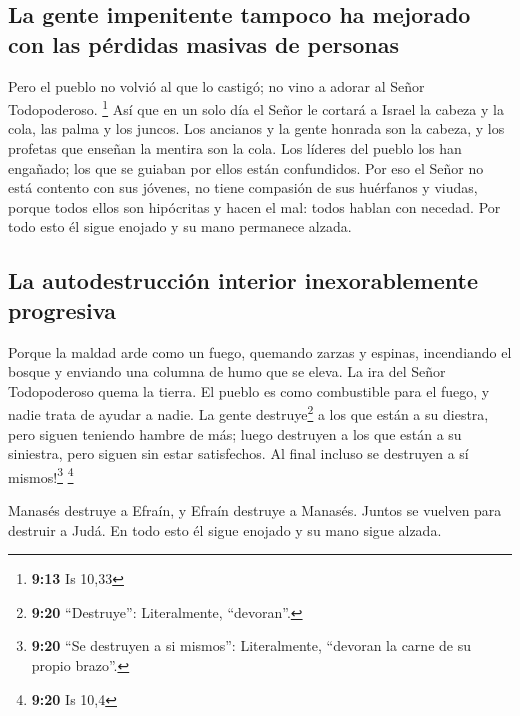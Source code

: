 \hypertarget{la-gente-impenitente-tampoco-ha-mejorado-con-las-puxe9rdidas-masivas-de-personas}{%
\subsection{La gente impenitente tampoco ha mejorado con las pérdidas
masivas de
personas}\label{la-gente-impenitente-tampoco-ha-mejorado-con-las-puxe9rdidas-masivas-de-personas}}

 Pero el pueblo no volvió al que lo castigó; no vino a
adorar al Señor Todopoderoso. \footnote{\textbf{9:13} Is 10,33}
 Así que en un solo día el Señor le cortará a Israel la
cabeza y la cola, las palma y los juncos.  Los ancianos y
la gente honrada son la cabeza, y los profetas que enseñan la mentira
son la cola.  Los líderes del pueblo los han engañado;
los que se guiaban por ellos están confundidos.  Por eso
el Señor no está contento con sus jóvenes, no tiene compasión de sus
huérfanos y viudas, porque todos ellos son hipócritas y hacen el mal:
todos hablan con necedad. Por todo esto él sigue enojado y su mano
permanece alzada.

\hypertarget{la-autodestrucciuxf3n-interior-inexorablemente-progresiva}{%
\subsection{La autodestrucción interior inexorablemente
progresiva}\label{la-autodestrucciuxf3n-interior-inexorablemente-progresiva}}

 Porque la maldad arde como un fuego, quemando zarzas y
espinas, incendiando el bosque y enviando una columna de humo que se
eleva.  La ira del Señor Todopoderoso quema la tierra. El
pueblo es como combustible para el fuego, y nadie trata de ayudar a
nadie.  La gente destruye\footnote{\textbf{9:20}
  ``Destruye'': Literalmente, ``devoran''.} a los que están a su
diestra, pero siguen teniendo hambre de más; luego destruyen a los que
están a su siniestra, pero siguen sin estar satisfechos. Al final
incluso se destruyen a sí mismos!\footnote{\textbf{9:20} ``Se destruyen
  a si mismos'': Literalmente, ``devoran la carne de su propio brazo''.}
\footnote{\textbf{9:20} Is 10,4}

 Manasés destruye a Efraín, y Efraín destruye a Manasés.
Juntos se vuelven para destruir a Judá. En todo esto él sigue enojado y
su mano sigue alzada.

